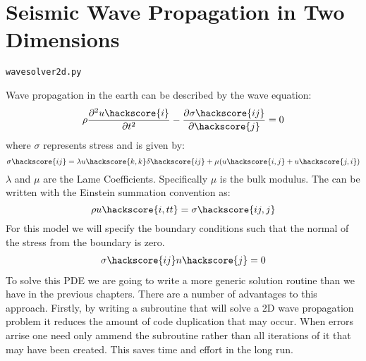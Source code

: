 
%
%
%

\section{Seismic Wave Propagation in Two Dimensions}

\verb|wavesolver2d.py|

Wave propagation in the earth can be described by the wave equation:
\begin{equation} \label{eqn:wav} \index{wave equation}
\rho \frac{\partial^{2}u\hackscore{i}}{\partial t^2} - \frac{\partial \sigma\hackscore{ij}}{\partial\hackscore{j}} = 0
\end{equation}
where $\sigma$ represents stress and is given by:
\begin{equation} \label{eqn:sigw}
 \sigma \hackscore{ij} = \lambda u\hackscore{k,k} \delta\hackscore{ij} + \mu ( u\hackscore{i,j} + u\hackscore{j,i})
\end{equation}
$\lambda$ and $\mu$ are the Lame Coefficients. Specifically $\mu$ is the bulk modulus. The  can be written with the Einstein summation convention as:
\begin{equation}
 \rho u\hackscore{i,tt} = \sigma\hackscore{ij,j}
\end{equation}
For this model we will specify the boundary conditions such that the normal of the stress from the boundary is zero.
\begin{eqnarray} \label{eqn:bdw}
\sigma \hackscore{ij}n\hackscore{j}=0
\end{eqnarray}
To solve this PDE we are going to write a more generic solution routine than we have in the previous chapters. There are a number of advantages to this approach. Firstly, by writing a subroutine that will solve a 2D wave propagation problem it reduces the amount of code duplication that may occur. When errors arrise one need only ammend the subroutine rather than all iterations of it that may have been created. This saves time and effort in the long run. 

